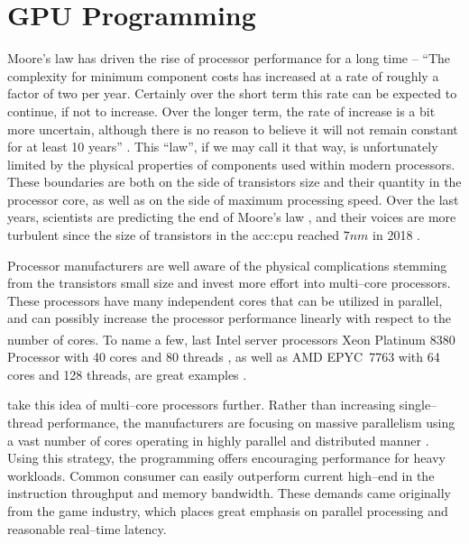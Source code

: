 \chapter{GPU Programming}
\label{chap:gpu}

Moore's law has driven the rise of processor performance for a long time -- \enquote{The complexity for minimum component costs has increased at a rate of roughly a factor of two per year. Certainly over the short term this rate can be expected to continue, if not to increase. Over the longer term, the rate of increase is a bit more uncertain, although there is no reason to believe it will not remain constant for at least 10 years} \citep{MooresLaw}. This \enquote{law}, if we may call it that way, is unfortunately limited by the physical properties of components used within modern processors.
These boundaries are both on the side of transistors size and their quantity in the processor core, as well as on the side of maximum processing speed.
Over the last years, scientists are predicting the end of Moore's law \citep{MooresLawEnd}, and their voices are more turbulent since the size of transistors in the \acrfull{acc:cpu} reached $7nm$ in 2018 \citep{SamsungSevenNm}.

Processor manufacturers are well aware of the physical complications stemming from the transistors small size and invest more effort into multi--core processors. These processors have many independent cores that can be utilized in parallel, and can possibly increase the processor performance linearly with respect to the number of cores. To name a few, last Intel server processors Xeon\textsuperscript{\textregistered} Platinum 8380 Processor with 40 cores and 80 threads \citep{IntelXeonPlatinum}, as well as AMD EPYC\texttrademark\ 7763 with 64 cores and 128 threads, are great examples \citep{AMDEpyc}.

 take this idea of multi--core processors further. Rather than increasing single--thread performance, the \gpu manufacturers are focusing on massive parallelism using a vast number of cores operating in highly parallel and distributed manner \citep{GPUComputingOwens}. Using this strategy, the \gpu programming offers encouraging performance for heavy workloads. Common consumer  can easily outperform current high--end  in the instruction throughput and memory bandwidth. These demands came originally from the game industry, which places great emphasis on parallel processing and reasonable real--time latency.

